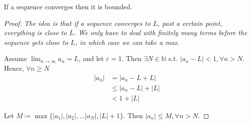 \begin{theorem}
    If a sequence converges then it is bounded.
\end{theorem}

\begin{proof}
    \textit{
        The idea is that if a sequence converges to $L$, 
        past a certain point, everything is close to $L$.
        We only have to deal with finitely many terms 
        before the sequence gets close to $L$,
        in which case we can take a max.
    }


    Assume $\lim_{n \to \infty}a_n = L$, and let $\varepsilon = 1$. 
    Then $\exists N \in \mathbb{N}$ s.t. $|a_n - L| < 1, \forall n > N$. 
    Hence, $\forall n \geq N$
    \begin{align*}
        |a_n| &= |a_n - L + L |  \\
        & \leq |a_n - L| + |L| \\
        & < 1 + |L|
    \end{align*}
    \medskip

    Let $M \coloneq \max \{ |a_1|, |a_2|, \hdots |a_N|, |L| + 1 \} $. 
    Then $ |a_n| \leq M, \forall n > N$.
\end{proof}

